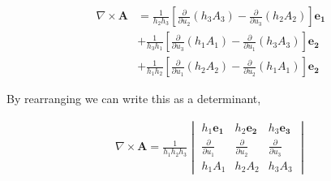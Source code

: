 \documentclass[11pt]{amsart}
\begin{document}
\begin{align*}
  \nabla\times\mathbf{A} &= \frac{1}{h_2h_3}\left[\frac{\partial}{\partial u_2}(h_3A_3)-\frac{\partial}{\partial u_3}(h_2A_2)\right]\mathbf{e_1} \\
&+ \frac{1}{h_3h_1}\left[\frac{\partial}{\partial u_3}(h_1A_1)-\frac{\partial}{\partial u_1}(h_3A_3)\right]\mathbf{e_2} \\
&+ \frac{1}{h_1h_2}\left[\frac{\partial}{\partial u_1}(h_2A_2)-\frac{\partial}{\partial u_2}(h_1A_1)\right]\mathbf{e_2}
\end{align*}

By rearranging we can write this as a determinant,

\begin{align*}
  \nabla\times\mathbf{A} = \frac{1}{h_1h_2h_3}
  \begin{vmatrix}
    h_1\mathbf{e_1} & h_2\mathbf{e_2} & h_3\mathbf{e_3} \\[6pt]
    \frac{\partial}{\partial u_1} & \frac{\partial}{\partial u_2} & \frac{\partial}{\partial u_3} \\[6pt]
    h_1A_1 & h_2A_2 & h_3A_3
  \end{vmatrix}
\end{align*}
\end{document}
